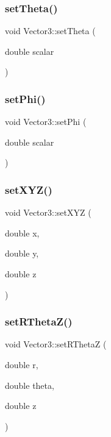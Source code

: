 \mbox{\label{class_vector3_a55a6be6dca9ee66a9bfe497ac8a0c13f}} 
\subsubsection{\texorpdfstring{setTheta()}{setTheta()}}
{\footnotesize\ttfamily void Vector3\+::set\+Theta (\begin{DoxyParamCaption}\item[{double}]{scalar }\end{DoxyParamCaption})}

\mbox{\label{class_vector3_a6a5aa0401fbcc6cfcde68ba486153b16}} 
\subsubsection{\texorpdfstring{setPhi()}{setPhi()}}
{\footnotesize\ttfamily void Vector3\+::set\+Phi (\begin{DoxyParamCaption}\item[{double}]{scalar }\end{DoxyParamCaption})}

\mbox{\label{class_vector3_accc0a2a83b45ba13ba0bc9f238e6d103}} 
\subsubsection{\texorpdfstring{setXYZ()}{setXYZ()}}
{\footnotesize\ttfamily void Vector3\+::set\+X\+YZ (\begin{DoxyParamCaption}\item[{double}]{x,  }\item[{double}]{y,  }\item[{double}]{z }\end{DoxyParamCaption})}

\mbox{\label{class_vector3_ad92ad388f1fb1d35c4efbd53d2c00776}} 
\subsubsection{\texorpdfstring{setRThetaZ()}{setRThetaZ()}}
{\footnotesize\ttfamily void Vector3\+::set\+R\+ThetaZ (\begin{DoxyParamCaption}\item[{double}]{r,  }\item[{double}]{theta,  }\item[{double}]{z }\end{DoxyParamCaption})}

